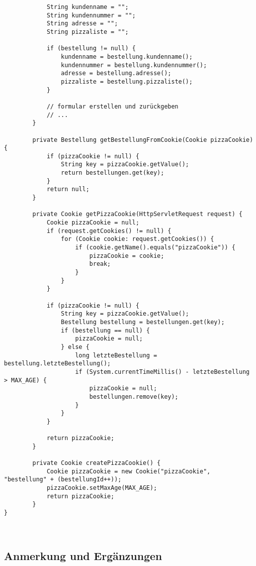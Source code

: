 \begin{verbatim}
            String kundenname = "";
            String kundennummer = "";
            String adresse = "";
            String pizzaliste = "";

            if (bestellung != null) {
                kundenname = bestellung.kundenname();
                kundennummer = bestellung.kundennummer();
                adresse = bestellung.adresse();
                pizzaliste = bestellung.pizzaliste();
            }

            // formular erstellen und zurückgeben
            // ...
        }

        private Bestellung getBestellungFromCookie(Cookie pizzaCookie) {
            if (pizzaCookie != null) {
                String key = pizzaCookie.getValue();
                return bestellungen.get(key);
            }
            return null;
        }

        private Cookie getPizzaCookie(HttpServletRequest request) {
            Cookie pizzaCookie = null;
            if (request.getCookies() != null) {
                for (Cookie cookie: request.getCookies()) {
                    if (cookie.getName().equals("pizzaCookie")) {
                        pizzaCookie = cookie;
                        break;
                    }
                }
            }

            if (pizzaCookie != null) {
                String key = pizzaCookie.getValue();
                Bestellung bestellung = bestellungen.get(key);
                if (bestellung == null) {
                    pizzaCookie = null;
                } else {
                    long letzteBestellung = bestellung.letzteBestellung();
                    if (System.currentTimeMillis() - letzteBestellung > MAX_AGE) {
                        pizzaCookie = null;
                        bestellungen.remove(key);
                    }
                }
            }

            return pizzaCookie;
        }

        private Cookie createPizzaCookie() {
            Cookie pizzaCookie = new Cookie("pizzaCookie", "bestellung" + (bestellungId++));
            pizzaCookie.setMaxAge(MAX_AGE);
            return pizzaCookie;
        }
}
\end{verbatim}\\


\subsection{Anmerkung und Ergänzungen}

